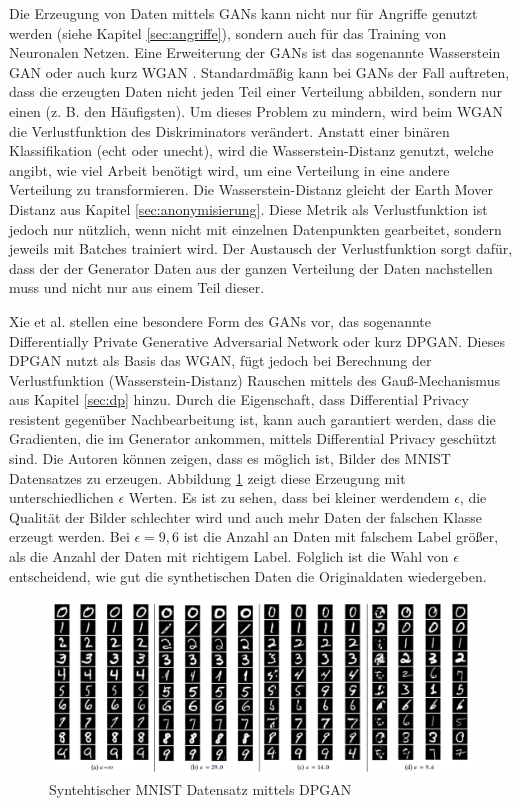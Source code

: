 Die Erzeugung von Daten mittels GANs kann nicht nur für Angriffe genutzt werden (siehe Kapitel \ref{sec:angriffe}), sondern auch für das Training von Neuronalen Netzen.
Eine Erweiterung der GANs ist das sogenannte Wasserstein GAN oder auch kurz WGAN \cite{P-92}. 
Standardmäßig kann bei GANs der Fall auftreten, dass die erzeugten Daten nicht jeden Teil einer Verteilung abbilden, sondern nur einen (z. B. den Häufigsten).
Um dieses Problem zu mindern, wird beim WGAN die Verlustfunktion des Diskriminators verändert. 
Anstatt einer binären Klassifikation (echt oder unecht), wird die Wasserstein-Distanz genutzt, welche angibt, wie viel Arbeit benötigt wird, um eine Verteilung in eine andere Verteilung zu transformieren. 
Die Wasserstein-Distanz gleicht der Earth Mover Distanz aus Kapitel \ref{sec:anonymisierung}.
Diese Metrik als Verlustfunktion ist jedoch nur nützlich, wenn nicht mit einzelnen Datenpunkten gearbeitet, sondern jeweils mit Batches trainiert wird.
Der Austausch der Verlustfunktion sorgt dafür, dass der der Generator Daten aus der ganzen Verteilung der Daten nachstellen muss und nicht nur aus einem Teil dieser.


Xie et al. \cite{P-70} stellen eine besondere Form des GANs vor, das sogenannte Differentially Private Generative Adversarial Network oder kurz DPGAN.
Dieses DPGAN nutzt als Basis das WGAN, fügt jedoch bei Berechnung der Verlustfunktion (Wasserstein-Distanz) Rauschen mittels des Gauß-Mechanismus aus Kapitel \ref{sec:dp} hinzu.
Durch die Eigenschaft, dass Differential Privacy resistent gegenüber Nachbearbeitung ist, kann auch garantiert werden, dass die Gradienten, die im Generator ankommen, mittels Differential Privacy geschützt sind.
Die Autoren können zeigen, dass es möglich ist, Bilder des MNIST Datensatzes \cite{D-MNIST} zu erzeugen.
Abbildung \ref{fig:dpgan} zeigt diese Erzeugung mit unterschiedlichen $\epsilon$ Werten.
Es ist zu sehen, dass bei kleiner werdendem $\epsilon$, die Qualität der Bilder schlechter wird und auch mehr Daten der falschen Klasse erzeugt werden. 
Bei $\epsilon=9,6$ ist die Anzahl an Daten mit falschem Label größer, als die Anzahl der Daten mit richtigem Label.
Folglich ist die Wahl von $\epsilon$ entscheidend, wie gut die synthetischen Daten die Originaldaten wiedergeben.

\begin{figure}[!htb]
    \centering
    \includegraphics[width=15cm]{figures/dpgan}
    \caption{Syntehtischer MNIST Datensatz mittels DPGAN \cite{P-70}}
    \label{fig:dpgan}
\end{figure} 

